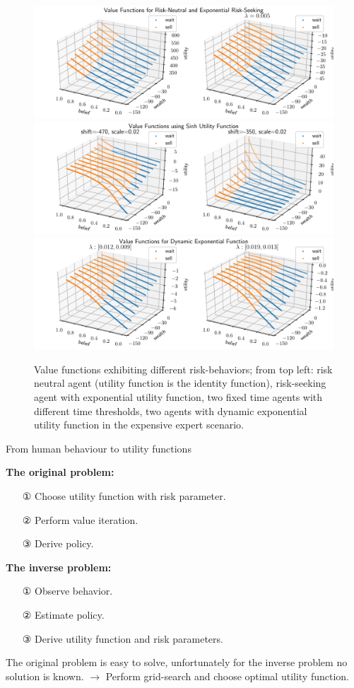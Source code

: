 \begin{figure}
    \includegraphics[width=0.9\linewidth]{img/exp_policy.pdf}\\
    \includegraphics[width=0.9\linewidth]{img/sinh_policy.pdf}\\
    \includegraphics[width=0.9\linewidth]{img/dyn_policy.pdf}
    \caption{Value functions exhibiting different risk-behaviors; from top left: risk neutral agent (utility function is the identity function), risk-seeking agent with exponential utility function, two fixed time agents with different time thresholds, two agents with dynamic exponential utility function in the expensive expert scenario.}
\end{figure}

\large{From human behaviour to utility functions}


\normalsize
\textbf{The original problem:}
\begin{itemize}
\item[①] Choose utility function with risk parameter.
\item[②] Perform value iteration.
\item[③] Derive policy.
\end{itemize}

\textbf{The inverse problem:}
\begin{itemize}
\item[①] Observe behavior.
\item[②] Estimate policy.
\item[③] Derive utility function and risk parameters.
\end{itemize}

The original problem is easy to solve, unfortunately for the inverse problem no solution is known. $\rightarrow$ Perform grid-search and choose optimal utility function.
